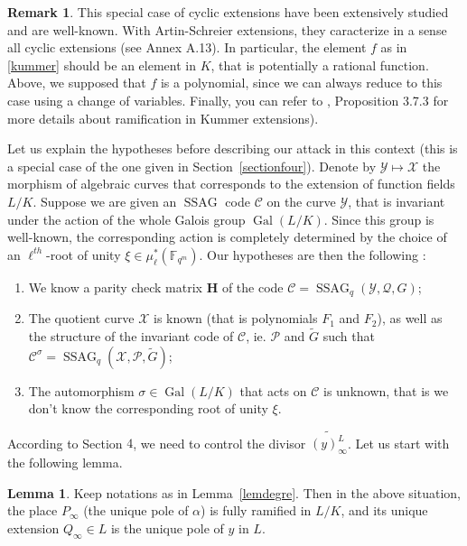\documentclass[10pt]{article}
\theoremstyle{definition}
\newtheorem{lem1}[thm]{Lemma}
\theoremstyle{definition}
\newtheorem{rq1}[thm]{Remark}
\theoremstyle{definition}
\newcommand{\s}{\vspace{0.3cm}}
\newcommand{\fqm}{\mathbb{F}_{q^m}}
\newcommand{\X}{\mathcal{X}}
\newcommand{\Y}{\mathcal{Y}}
\newcommand{\PR}{\mathcal{P}}
\newcommand{\QR}{\mathcal{Q}}
\newcommand{\Gal}{\operatorname{Gal}}
\newcommand{\ssag}{\operatorname{SSAG}}
\begin{document}
\s

\begin{rq1} \label{pk des polynomes}
This special case of cyclic extensions have been extensively studied and are well-known. With Artin-Schreier extensions, they caracterize in a sense all cyclic extensions (see \cite{Sti} Annex A.13). In particular, the element $f$ as in \eqref{kummer} should be an element in $K$, that is potentially a rational function. Above, we supposed that $f$ is a polynomial, since we can always reduce to this case using a change of variables. Finally, you can refer to \cite{Sti}, Proposition 3.7.3 for more details about ramification in Kummer extensions).
\end{rq1}

\s

Let us explain the hypotheses before describing our attack in this context (this is a special case of the one given in Section~\ref{sectionfour}). Denote by $\Y \longmapsto \X$ the morphism of algebraic curves that corresponds to the extension of function fields $L/K$. Suppose we are given an $\ssag$ code $\mathcal{C}$ on the curve $\Y$, that is invariant under the action of the whole Galois group $\Gal(L/K)$. Since this group is well-known, the corresponding action is completely determined by the choice of an $\ell^{th}$-root of unity $\xi \in \mu^*_{\ell}(\fqm)$. Our hypotheses are then the following :

\s

\begin{enumerate}
\item We know a parity check matrix $\mathbf{H}$ of the code $\mathcal{C} = \ssag_q(\Y,\QR,G)$;
\item The quotient curve $\X$ is known (that is polynomials $F_1$ and $F_2$), as well as the structure of the invariant code of $\mathcal{C}$, ie. $\PR$ and $\tilde{G}$ such that $\mathcal{C}^{\sigma} = \ssag_q(\X,\PR,\tilde{G})$;
\item The automorphism $\sigma \in\Gal(L/K)$ that acts on $\mathcal{C}$ is unknown, that is we don't know the corresponding root of unity $\xi$.
\end{enumerate}

\s


According to Section $4$, we need to control the divisor $\widetilde{(y)^L_{\infty}}$. Let us start with the following lemma.

\s

\begin{lem1} \label{ramification}
Keep notations as in Lemma~\ref{lemdegre}. Then in the above situation, the place $P_{\infty}$ (the unique pole of $\alpha$) is fully ramified in $L/K$, and its unique extension $Q_{\infty} \in L$ is the unique pole of $y$ in $L$. 
\end{lem1}
\end{document}
